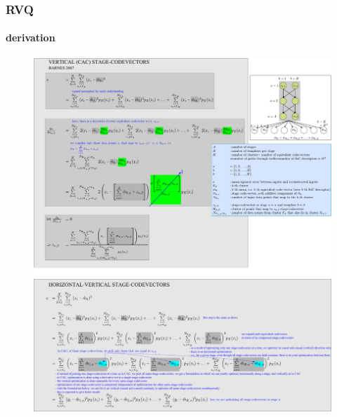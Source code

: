 \begin{frame}[plain]
\frametitle{RVQ}
\framesubtitle{derivation}
\logoCSIPCPL\mypagenum
	\begin{changemargin}{-1.3in}{0in}
		\begin{figure}				
			\includegraphics[width=1.3\textwidth]{figs/RVQ_CAC_derivation.pdf}
		\end{figure}
	\end{changemargin}
\end{frame}


